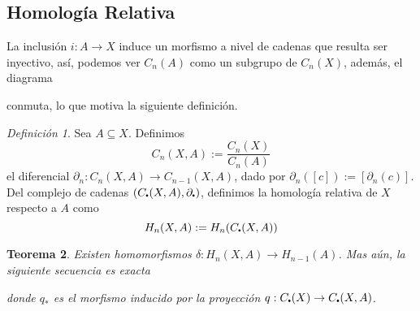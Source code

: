 \documentclass[aop]{imsart2}
\theoremstyle{plain}
\newtheorem{teo}{Teorema}[section]
\theoremstyle{remark}
\newtheorem{dfn}[teo]{Definición}
\newcommand\sbullet[1][.5]{\mathbin{\vcenter{\hbox{\scalebox{#1}{$\bullet$}}}}}
\begin{document}
\subsection{Homología Relativa} \hspace{1mm}

\vspace{2mm}
\noindent La inclusión $i:A\to X$ induce un morfismo a nivel de cadenas que resulta ser inyectivo,
así, podemos ver $C_{n}(A)$ como un subgrupo de $C_{n}(X)$, además, el diagrama

\vspace{2mm}
\centerline{
}
\vspace{2mm}
\noindent conmuta, lo que motiva la siguiente definición.

\begin{dfn}
    Sea $A\subseteq X$. Definimos
    \begin{equation*}
        C_{n}(X,A):=\frac{C_{n}(X)}{C_{n}(A)}
    \end{equation*}
    el diferencial $\partial_{n}:C_{n}(X,A)\to C_{n-1}(X,A)$, dado por $\partial_{n}([c])
    :=[\partial_{n}(c)]$. Del complejo de cadenas $(C_{\sbullet}(X,A),\partial_{\sbullet})$, 
    definimos la homología relativa de $X$ respecto a $A$ como
    \begin{equation*}
        H_{n}(X,A):=H_{n}(C_{\sbullet}(X,A))
    \end{equation*}
\end{dfn}

\begin{teo}
    Existen homomorfismos $\delta:H_{n}(X,A)\to H_{n-1}(A)$. Mas aún, la siguiente secuencia es 
    exacta
    
    \vspace{2mm}
    \centerline{
    }
    \vspace{2mm}
    donde $q_{*}$ es el morfismo inducido por la proyección $q:C_{\sbullet}(X)\to 
    C_{\sbullet}(X,A)$.
\end{teo}
\end{document}
